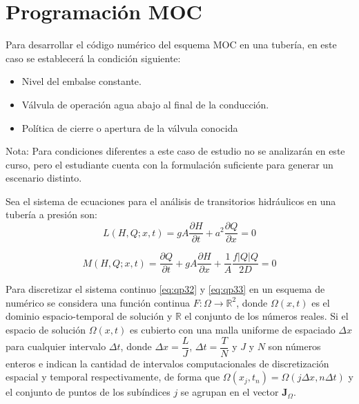 \documentclass[letterpaper]{report}
\begin{document}
\section{Programación MOC}
Para desarrollar el código numérico del esquema MOC en una tubería, en este caso se establecerá la condición siguiente:
\begin{itemize}
	\item Nivel del embalse constante.
	\item Válvula de operación agua abajo al final de la conducción.
	\item Política de cierre o apertura de la válvula conocida
\end{itemize}
Nota: Para condiciones diferentes a este caso de estudio no se analizarán en este curso, pero el estudiante cuenta con la formulación suficiente para generar un escenario distinto.\bigskip

Sea el sistema de ecuaciones para el análisis de transitorios hidráulicos en una tubería a presión son:
\begin{equation}
	L(H,Q;x,t)=gA\dfrac{\partial H}{\partial t}+a^2\dfrac{\partial Q}{\partial x}=0
\label{eq:qp32}
\end{equation}
	
\begin{equation}
	M(H,Q;x,t)=\dfrac{\partial Q}{\partial t}+gA\dfrac{\partial H}{\partial x}+\dfrac{1}{A}\dfrac{f|Q|Q}{2D}=0
\label{eq:qp33}
\end{equation}

Para discretizar el sistema continuo \ref{eq:qp32} y \ref{eq:qp33} en un esquema de numérico se considera una función continua $F:\Omega\rightarrow\mathbb{R}^2$, donde $\Omega(x,t)$ es el dominio espacio-temporal de solución y $\mathbb{R}$  el conjunto de los números reales. 
Si el espacio de solución $\Omega(x,t)$ es cubierto con una malla uniforme de espaciado $\Delta x$ para cualquier intervalo $\Delta t$, donde $\Delta x=\dfrac{L}{J}$,  $\Delta t=\dfrac{T}{N}$ y $J$ y $N$ son números enteros e indican la cantidad de intervalos computacionales de discretización espacial y temporal respectivamente, de forma que $\Omega\left(x_j,t_n\right)=\Omega(j\Delta x,n\Delta t)$ y el conjunto de puntos de los subíndices $j$ se agrupan en el vector $\mathbf{J}_\Omega$.\bigskip
\end{document}
